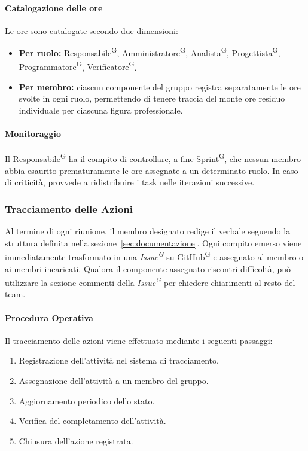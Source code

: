\documentclass[a4paper,12pt]{article}
\providecommand{\glslink}[2]{\href{https://alittlebyte-19.github.io/Documentazione/glossario.html\#gls-#1}{\underline{#2}\textsuperscript{\scriptsize G}}}
\begin{document}
\paragraph{Catalogazione delle ore}
Le ore sono catalogate secondo due dimensioni:
\begin{itemize}
    \item \textbf{Per ruolo:} \glslink{responsabile}{Responsabile}, \glslink{amministratore}{Amministratore}, \glslink{analista}{Analista}, \glslink{progettista}{Progettista}, \glslink{programmatore}{Programmatore}, \glslink{verificatore}{Verificatore}.
    \item \textbf{Per membro:} ciascun componente del gruppo registra separatamente le ore svolte in ogni ruolo, permettendo di tenere traccia del monte ore residuo individuale per ciascuna figura professionale.
\end{itemize}

\paragraph{Monitoraggio}
Il \glslink{responsabile}{Responsabile} ha il compito di controllare, a fine \glslink{sprint}{Sprint}, che nessun membro abbia esaurito prematuramente le ore assegnate a un determinato ruolo. In caso di criticità, provvede a ridistribuire i task nelle iterazioni successive.

\subsubsection{Tracciamento delle Azioni}

Al termine di ogni riunione, il membro designato redige il verbale seguendo la struttura definita nella sezione~\ref{sec:documentazione}. Ogni compito emerso viene immediatamente trasformato in una \textit{\glslink{issue}{Issue}} su \glslink{github}{GitHub} e assegnato al membro o ai membri incaricati. Qualora il componente assegnato riscontri difficoltà, può utilizzare la sezione commenti della \textit{\glslink{issue}{Issue}} per chiedere chiarimenti al resto del team.

\paragraph{Procedura Operativa}
Il tracciamento delle azioni viene effettuato mediante i seguenti passaggi:

\begin{enumerate}
    \item Registrazione dell'attività nel sistema di tracciamento.
    \item Assegnazione dell'attività a un membro del gruppo.
    \item Aggiornamento periodico dello stato.
    \item Verifica del completamento dell'attività.
    \item Chiusura dell'azione registrata.
\end{enumerate}
\end{document}
